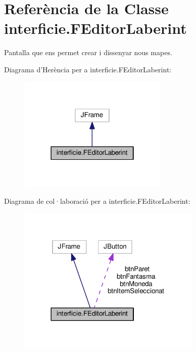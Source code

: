 \hypertarget{classinterficie_1_1_f_editor_laberint}{\section{Referència de la Classe interficie.\+F\+Editor\+Laberint}
\label{classinterficie_1_1_f_editor_laberint}
}


Pantalla que ens permet crear i dissenyar nous mapes.  




Diagrama d'Herència per a interficie.\+F\+Editor\+Laberint\+:\nopagebreak
\begin{figure}[H]
\begin{center}
\leavevmode
\includegraphics[width=202pt]{classinterficie_1_1_f_editor_laberint__inherit__graph}
\end{center}
\end{figure}


Diagrama de col·laboració per a interficie.\+F\+Editor\+Laberint\+:\nopagebreak
\begin{figure}[H]
\begin{center}
\leavevmode
\includegraphics[width=249pt]{classinterficie_1_1_f_editor_laberint__coll__graph}
\end{center}
\end{figure}
